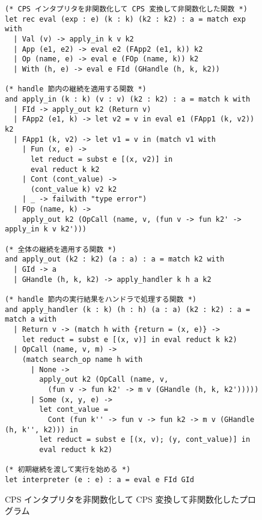 \begin{figure}
\begin{spacing}{0.9}
\begin{verbatim}
(* CPS インタプリタを非関数化して CPS 変換して非関数化した関数 *)
let rec eval (exp : e) (k : k) (k2 : k2) : a = match exp with
  | Val (v) -> apply_in k v k2
  | App (e1, e2) -> eval e2 (FApp2 (e1, k)) k2
  | Op (name, e) -> eval e (FOp (name, k)) k2
  | With (h, e) -> eval e FId (GHandle (h, k, k2))

(* handle 節内の継続を適用する関数 *)
and apply_in (k : k) (v : v) (k2 : k2) : a = match k with
  | FId -> apply_out k2 (Return v)
  | FApp2 (e1, k) -> let v2 = v in eval e1 (FApp1 (k, v2)) k2
  | FApp1 (k, v2) -> let v1 = v in (match v1 with
    | Fun (x, e) ->
      let reduct = subst e [(x, v2)] in
      eval reduct k k2
    | Cont (cont_value) ->
      (cont_value k) v2 k2
    | _ -> failwith "type error")
  | FOp (name, k) ->
    apply_out k2 (OpCall (name, v, (fun v -> fun k2' -> apply_in k v k2')))

(* 全体の継続を適用する関数 *)
and apply_out (k2 : k2) (a : a) : a = match k2 with
  | GId -> a
  | GHandle (h, k, k2) -> apply_handler k h a k2

(* handle 節内の実行結果をハンドラで処理する関数 *)
and apply_handler (k : k) (h : h) (a : a) (k2 : k2) : a = match a with
  | Return v -> (match h with {return = (x, e)} ->
    let reduct = subst e [(x, v)] in eval reduct k k2)
  | OpCall (name, v, m) ->
    (match search_op name h with
      | None ->
        apply_out k2 (OpCall (name, v,
          (fun v -> fun k2' -> m v (GHandle (h, k, k2')))))
      | Some (x, y, e) ->
        let cont_value =
          Cont (fun k'' -> fun v -> fun k2 -> m v (GHandle (h, k'', k2))) in
        let reduct = subst e [(x, v); (y, cont_value)] in
        eval reduct k k2)

(* 初期継続を渡して実行を始める *)
let interpreter (e : e) : a = eval e FId GId
\end{verbatim}
\caption{CPS インタプリタを非関数化して CPS 変換して非関数化したプログラム}
\label{figure:4defun}
\end{spacing}
\end{figure}

